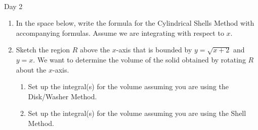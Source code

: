 \documentclass[11pt,fleqn]{article}
\begin{document}
\renewcommand{\headrulewidth}{0pt}
\newcommand{\blank}[1]{\rule{#1}{0.75pt}}
\newcommand{\bc}{\begin{center}}
\newcommand{\ec}{\end{center}}
\renewcommand{\d}{\displaystyle}

\vspace*{-0.7in}

\begin{center}
  \large
  \\
  Day 2
\end{center}

\begin{enumerate}
\item In the space below, write the formula for the Cylindrical Shells Method with accompanying formulas. Assume we are integrating with respect to $x.$\\
\vspace{1in}

\item Sketch the region $R$ above the $x$-axis that is bounded by $y=\sqrt{x+2}$ and $y=x$. We want to determine the volume of the solid obtained by rotating $R$ about the $x$-axis. \\

\vspace{1in}


\begin{enumerate}
\item Set up the integral(s) for the volume assuming you are using the Disk/Washer Method. 

\vfill

\item Set up the integral(s) for the volume assuming you are using the Shell Method. 

\vfill


\end{enumerate}
\end{enumerate}
\end{document}
